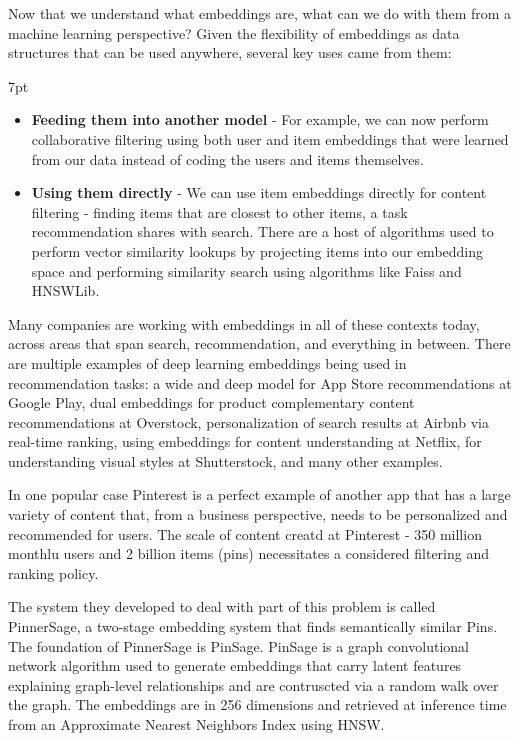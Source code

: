 \documentclass[11pt, table]{diazessay} %
\newenvironment{formal}{%
  \def\FrameCommand{%
    \hspace{1pt}%
    {\color{w_lightblue}\vrule width 2pt}%
    {\color{formalshade}\vrule width 4pt}%
    \colorbox{formalshade}%
  }%
  \MakeFramed{\advance\hsize-\width\FrameRestore}%
  \noindent\hspace{-4.55pt}%
  \begin{adjustwidth}{}{7pt}%
  \vspace{2pt}\vspace{2pt}%
}
{%
  \vspace{2pt}\end{adjustwidth}\endMakeFramed%
}
\begin{document}
\begin{sloppypar}
Now that we understand what embeddings are, what can we do with them from a machine learning perspective? Given the flexibility of embeddings as data structures that can be used anywhere, several key uses came from them:

\begin{formal}
\begin{itemize}
\item\textbf{Feeding them into another model} - For example, we can now perform collaborative filtering using both user and item embeddings that were learned from our data instead of coding the users and items themselves. 
\item\textbf{Using them directly} - We can use item embeddings directly for content filtering - finding items that are closest to other items, a task recommendation shares with search. There are a host of algorithms used to perform vector similarity lookups by projecting items into our embedding space and performing similarity search using algorithms like Faiss and HNSWLib.   
\end{itemize}
\end{formal}

Many companies are working with embeddings in all of these contexts today, across areas that span search, recommendation, and everything in between. There are multiple examples of deep learning embeddings being used in recommendation tasks: a wide and deep model for App Store recommendations at Google Play\citep{zhang2019deep}, dual embeddings for product complementary content recommendations at Overstock\citep{kvernadze2022two}, personalization of search results at Airbnb via real-time ranking\citep{grbovic2018real}, using embeddings for content understanding at Netflix\citep{dye_ekandham_saluja_rastogi_2020}, for understanding visual styles at Shutterstock\citep{gomez2022learning}, and many other examples. 

In one popular case Pinterest is a perfect example of another app that has a large variety of content that, from a business perspective, needs to be personalized and recommended for users. The scale of content creatd at Pinterest - 350 million monthlu users and 2 billion items (pins) necessitates a considered filtering and ranking policy. 

The system they developed to deal with part of this problem is called PinnerSage, a two-stage embedding system that finds semantically similar Pins\citep{pal2020pinnersage}. The foundation of PinnerSage is PinSage\citep{ying2018graph}. PinSage is a graph convolutional network algorithm used to generate embeddings that carry latent features explaining graph-level relationships and are contruscted via a random walk over the graph. The embeddings are in 256 dimensions and retrieved at inference time from an Approximate Nearest Neighbors Index using HNSW. 


\end{sloppypar}
\end{document}
